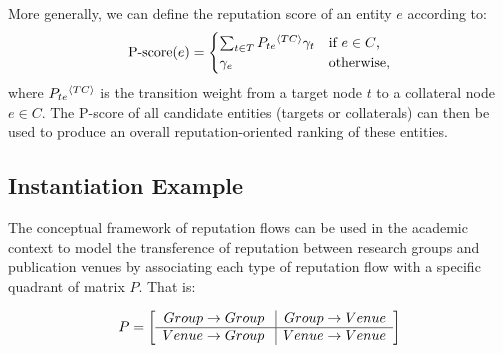 \documentclass[notitlepage]{svjour3}
\begin{document}
%
More generally, we can define the reputation score of an entity $e$ according to:
\begin{align}\label{eq:pscore}
  \text{P-score}(e) = \begin{cases}
	\sum_{t \in T} P_{te}{^{\langle TC \rangle}} \gamma_t & \text{if $e \in C$,}\\
    \gamma_e &\text{otherwise,}
  \end{cases}
\end{align}
\noindent where $P_{te}{^{\langle TC \rangle}}$ is the transition weight from a target node $t$ to a collateral node $e \in C$. The P-score of all candidate entities (targets or collaterals) can then be used to produce an overall reputation-oriented ranking of these entities.


\subsection{Instantiation Example}\label{sec:example}

The conceptual framework of reputation flows can be used in the academic context
to model the transference of reputation between research groups and 
publication venues by associating each type of reputation flow with a specific quadrant
of matrix $P$. That is:

\begin{align}\label{eq:newp}
P =
\left[
\begin{array}{r | r}
Group \rightarrow {Group\ } & Group \rightarrow Venue \\
\hline
Venue \rightarrow {Group\ } & Venue \rightarrow Venue \\
\end{array}
\right]
\end{align}
\end{document}
